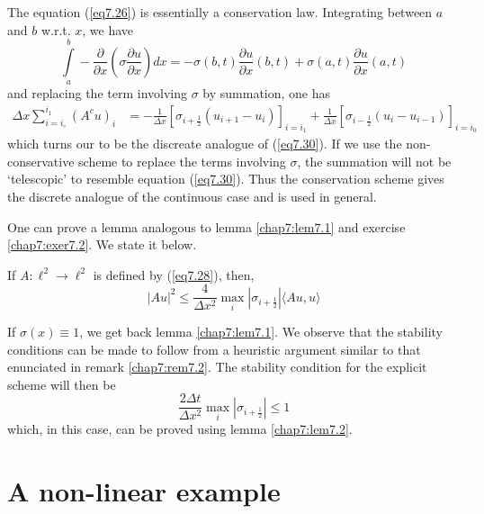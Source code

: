 \begin{remark}\label{chap7:rem7.3}
The equation (\ref{eq7.26}) is essentially a conservation
law. Integrating between $a$ and $b$ w.r.t. $x$, we have  
$$
\int\limits^b_a - \frac{\partial}{\partial x} \left(\sigma
\frac{\partial u}{\partial x}\right) dx = - \sigma (b,t) \frac{\partial u
}{\partial x} (b,t) + \sigma (a,t) \frac{\partial u}{\partial x} (a,t) 
$$
and replacing the term involving $\sigma$ by summation, one has 
\begin{align*}
\Delta x \sum\limits^{i_1}_{i=i_\circ} (A^cu)_i & = -\frac{1}{\Delta
  x} \left[ \sigma_{i+\frac{1}{2}} (u_{i+1} - u_i)\right]_{i=i_1} +
\frac{1}{\Delta x} \left[\sigma_{i-\frac{1}{2}} (u_i -
  u_{i-1}) \right]_{i=i_0} \tag{7.30}\label{eq7.30} 
\end{align*}\pageoriginale
which turns our to be the discreate analogue of (\ref{eq7.30}). If we
use the non-conservative scheme to replace the terms involving
$\sigma$, the summation will  not be `telescopic' to resemble equation
(\ref{eq7.30}). Thus the conservation scheme gives the discrete
analogue of the continuous case and is used in general. 
\end{remark}

One can prove a lemma analogous  to lemma \ref{chap7:lem7.1} and exercise \ref{chap7:exer7.2}. We state it below.

\begin{lem}\label{chap7:lem7.2}
If $A : \ell^2 \to \ell^2$ is defined by (\ref{eq7.28}), then,
\begin{equation*}
|Au|^2 \leq \frac{4}{\Delta x^2} \max\limits_i |\sigma_{i+\frac{1}{2}}| \langle Au, u\rangle  \tag{7.31}\label{eq7.31}
\end{equation*}
\end{lem}

\begin{remark}\label{chap7:rem7.4}
If $\sigma (x) \equiv 1$, we get back lemma \ref{chap7:lem7.1}. We observe that the stability conditions can be made to follow from a heuristic argument similar to that enunciated in remark \ref{chap7:rem7.2}. The stability condition for the explicit scheme will then be
$$
\frac{2\Delta t}{\Delta x^2} \max\limits_i |\sigma_{i+\frac{1}{2}}| \leq 1
$$
which, in this case, can be proved using lemma \ref{chap7:lem7.2}.
\end{remark}

\section{A non-linear example}\label{chap7:sec7.8}

